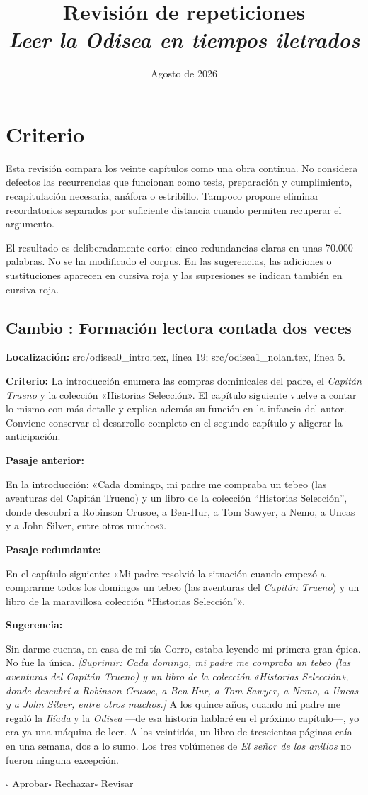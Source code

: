 \documentclass[12pt,a4paper]{article}
\title{Revisión de repeticiones\\[0.4em]\large\emph{Leer la Odisea en tiempos iletrados}}
\author{}
\date{Agosto de 2026}
\newcommand{\quita}[1]{\textcolor{rojocambio}{\textit{[Suprimir: #1]}}}
\newcounter{cambio}
\newcommand{\propuesta}[6]{%
  \refstepcounter{cambio}%
  \subsection*{Cambio \thecambio: #1}
  \noindent\textbf{Localización:} #2.\par
  \noindent\textbf{Criterio:} #3\par
  \medskip
  \noindent\textbf{Pasaje anterior:}\par
  #4\par
  \medskip
  \noindent\textbf{Pasaje redundante:}\par
  #5\par
  \medskip
  \noindent\textbf{Sugerencia:}\par
  #6\par
  \medskip
  \noindent$\square$ Aprobar\qquad$\square$ Rechazar\qquad$\square$ Revisar
  \par\bigskip
}
\begin{document}
\maketitle

\section*{Criterio}

Esta revisión compara los veinte capítulos como una obra continua. No considera defectos las recurrencias que funcionan como tesis, preparación y cumplimiento, recapitulación necesaria, anáfora o estribillo. Tampoco propone eliminar recordatorios separados por suficiente distancia cuando permiten recuperar el argumento.

El resultado es deliberadamente corto: cinco redundancias claras en unas 70.000 palabras. No se ha modificado el corpus. En las sugerencias, las adiciones o sustituciones aparecen en cursiva roja y las supresiones se indican también en cursiva roja.

\propuesta
  {Formación lectora contada dos veces}
  {src/odisea0\_intro.tex, línea 19; src/odisea1\_nolan.tex, línea 5}
  {La introducción enumera las compras dominicales del padre, el \emph{Capitán Trueno} y la colección «Historias Selección». El capítulo siguiente vuelve a contar lo mismo con más detalle y explica además su función en la infancia del autor. Conviene conservar el desarrollo completo en el segundo capítulo y aligerar la anticipación.}
  {En la introducción: «Cada domingo, mi padre me compraba un tebeo (las aventuras del Capitán Trueno) y un libro de la colección “Historias Selección”, donde descubrí a Robinson Crusoe, a Ben-Hur, a Tom Sawyer, a Nemo, a Uncas y a John Silver, entre otros muchos».}
  {En el capítulo siguiente: «Mi padre resolvió la situación cuando empezó a comprarme todos los domingos un tebeo (las aventuras del \emph{Capitán Trueno}) y un libro de la maravillosa colección “Historias Selección”».}
  {Sin darme cuenta, en casa de mi tía Corro, estaba leyendo mi primera gran épica. No fue la única. \quita{Cada domingo, mi padre me compraba un tebeo (las aventuras del Capitán Trueno) y un libro de la colección «Historias Selección», donde descubrí a Robinson Crusoe, a Ben-Hur, a Tom Sawyer, a Nemo, a Uncas y a John Silver, entre otros muchos.} A los quince años, cuando mi padre me regaló la \emph{Ilíada} y la \emph{Odisea} ---de esa historia hablaré en el próximo capítulo---, yo era ya una máquina de leer. A los veintidós, un libro de trescientas páginas caía en una semana, dos a lo sumo. Los tres volúmenes de \emph{El señor de los anillos} no fueron ninguna excepción.}
\end{document}
